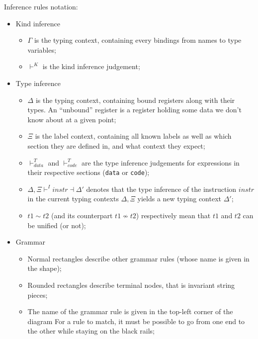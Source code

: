 Inference rules notation:
\begin{itemize}
  \item Kind inference
        \begin{itemize}
          \item $\Gamma$ is the typing context, containing every bindings from names to type variables;
          \item $\vdash^{K}$ is the kind inference judgement;
        \end{itemize}
  \item Type inference
        \begin{itemize}
          \item $\Delta$ is the typing context, containing bound registers along with their types.
                An ``unbound'' register is a register holding some data we don't know about at a given point;
          \item $\Xi$ is the label context, containing all known labels as well as which section they are defined in, and what context they expect;
          \item $\vdash^{T}_{data}$ and $\vdash^{T}_{code}$ are the type inference judgements for expressions in their respective sections (\texttt{data} or \texttt{code});
          \item $\Delta,\Xi\vdash^{I}instr\dashv\Delta'$ denotes that the type inference of the instruction $instr$ in the current typing contexts $\Delta,\Xi$ yields a new typing context $\Delta'$;
          \item $t1 \sim t2$ (and its counterpart $t1 \nsim t2$) respectively mean that $t1$ and $t2$ can be unified (or not);
        \end{itemize}
  \item Grammar
        \begin{figure}[H]
          \centering
        \end{figure}
        \begin{itemize}
          \item Normal rectangles describe other grammar rules (whose name is given in the shape);
          \item Rounded rectangles describe terminal nodes, that is invariant string pieces;
          \item The name of the grammar rule is given in the top-left corner of the diagram
                For a rule to match, it must be possible to go from one end to the other while staying on the black rails;
        \end{itemize}
\end{itemize}

